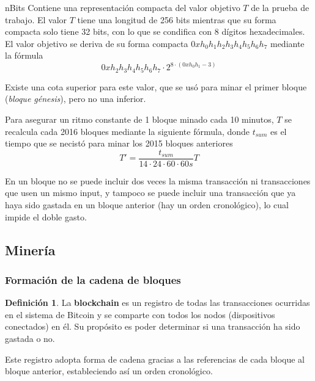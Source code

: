 \documentclass{beamer}
\theoremstyle{definition}
\newtheorem{defi}{Definición}
\begin{document}
\begin{frame}
	\begin{block}{nBits}
		Contiene una representación compacta del valor objetivo $T$ de la prueba de trabajo. El valor $T$ tiene una longitud de 256 bits mientras que su forma compacta solo tiene 32 bits, con lo que se condifica con 8 dígitos hexadecimales. El valor objetivo se deriva de su forma compacta $0xh_0 h_1 h_2 h_3 h_4 h_5 h_6 h_7$ mediante la fórmula
		$$0xh_2h_3h_4h_5h_6h_7 \cdot 2^{8\cdot(0xh_0h_1-3)}$$
	\end{block}
\end{frame}

\begin{frame}
	Existe una cota superior para este valor, que se usó para minar el primer bloque (\emph{bloque génesis}), pero no una inferior. 
	
	Para asegurar un ritmo constante de 1 bloque minado cada 10 minutos, $T$ se recalcula cada 2016 bloques mediante la siguiente fórmula, donde $t_{sum}$ es el tiempo que se necistó para minar los 2015 bloques anteriores
	$$ T' =	\frac{t_{sum}}{14\cdot 24\cdot 60\cdot 60s}T$$
\end{frame}
\begin{frame}
	\begin{alertblock}{}
		En un bloque no se puede incluir dos veces la misma transacción ni transacciones que usen un mismo input, y tampoco se puede incluir una transacción que ya haya sido gastada en un bloque anterior (hay un orden cronológico), lo cual impide el doble gasto.
	\end{alertblock}
\end{frame}


\subsection{Minería}
\begin{frame}
	\frametitle{Formación de la cadena de bloques}
	
	\begin{defi}
		La \textbf{blockchain} es un registro de todas las transacciones ocurridas en el sistema de Bitcoin y se comparte con todos los nodos (dispositivos conectados) en él. Su propósito es poder determinar si una transacción ha sido gastada o no.
	\end{defi}\pause

Este registro adopta forma de cadena gracias a las referencias de cada bloque al bloque anterior, estableciendo así un orden cronológico.
\end{frame}
\end{document}
